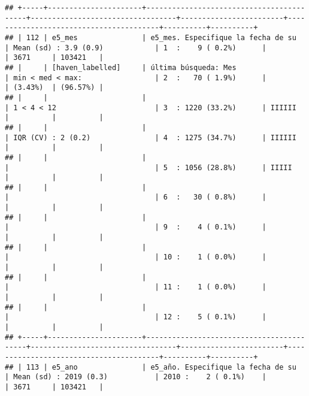 \documentclass[]{article}
\begin{document}
\begin{verbatim}
## +-----+----------------------+------------------------------------------+----------------------------------+------------------------+----------------------------------------+----------+----------+
## | 112 | e5_mes               | e5_mes. Especifique la fecha de su       | Mean (sd) : 3.9 (0.9)            | 1  :    9 ( 0.2%)      |                                        | 3671     | 103421   |
## |     | [haven_labelled]     | última búsqueda: Mes                     | min < med < max:                 | 2  :   70 ( 1.9%)      |                                        | (3.43%)  | (96.57%) |
## |     |                      |                                          | 1 < 4 < 12                       | 3  : 1220 (33.2%)      | IIIIII                                 |          |          |
## |     |                      |                                          | IQR (CV) : 2 (0.2)               | 4  : 1275 (34.7%)      | IIIIII                                 |          |          |
## |     |                      |                                          |                                  | 5  : 1056 (28.8%)      | IIIII                                  |          |          |
## |     |                      |                                          |                                  | 6  :   30 ( 0.8%)      |                                        |          |          |
## |     |                      |                                          |                                  | 9  :    4 ( 0.1%)      |                                        |          |          |
## |     |                      |                                          |                                  | 10 :    1 ( 0.0%)      |                                        |          |          |
## |     |                      |                                          |                                  | 11 :    1 ( 0.0%)      |                                        |          |          |
## |     |                      |                                          |                                  | 12 :    5 ( 0.1%)      |                                        |          |          |
## +-----+----------------------+------------------------------------------+----------------------------------+------------------------+----------------------------------------+----------+----------+
## | 113 | e5_ano               | e5_año. Especifique la fecha de su       | Mean (sd) : 2019 (0.3)           | 2010 :    2 ( 0.1%)    |                                        | 3671     | 103421   |

\end{verbatim}
\end{document}
